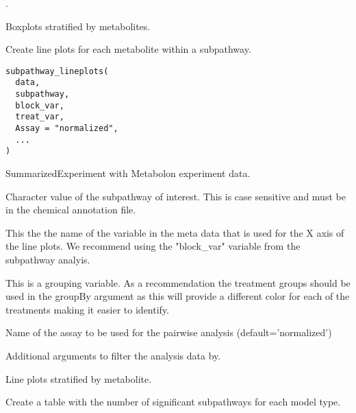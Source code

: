 \documentclass[a4paper]{book}
\begin{document}
%
\begin{Details}
.
\end{Details}
%
\begin{Value}
Boxplots stratified by metabolites.
\end{Value}
%
\begin{Description}
Create line plots for each metabolite within a subpathway.
\end{Description}
%
\begin{Usage}
\begin{verbatim}
subpathway_lineplots(
  data,
  subpathway,
  block_var,
  treat_var,
  Assay = "normalized",
  ...
)
\end{verbatim}
\end{Usage}
%
\begin{Arguments}
\begin{ldescription}
\item[\code{data}] SummarizedExperiment with Metabolon experiment data.

\item[\code{subpathway}] Character value of the subpathway of interest. This is case
sensitive and must be in the chemical annotation file.

\item[\code{block\_var}] This the the name of the variable in the meta data that is used for the
X axis of the line plots. We recommend using the "block\_var" variable from the
subpathway analyis.

\item[\code{treat\_var}] This is a grouping variable. As a recommendation the treatment
groups should be used in the groupBy argument as this will provide a different color
for each of the treatments making it easier to identify.

\item[\code{Assay}] Name of the assay to be used for the pairwise analysis (default='normalized')

\item[\code{...}] Additional arguments to filter the analysis data by.
\end{ldescription}
\end{Arguments}
%
\begin{Value}
Line plots stratified by metabolite.
\end{Value}
%
\begin{Description}
Create a table with the number of significant subpathways for each model type.
\end{Description}
\end{document}
